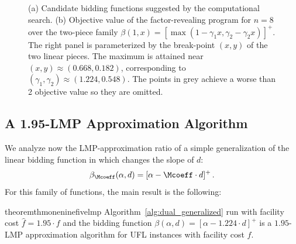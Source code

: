 \begin{figure}[H]
\centering
\begin{subfigure}{.465\textwidth}
  \centering
  \raisebox{0.0in}{}
  \caption{}
  \label{fig:sub1}
\end{subfigure}%
\begin{subfigure}{.535\textwidth}
  \centering
  \raisebox{0in}{}
  \caption{}
  \label{fig:sub2}
\end{subfigure}
\caption{(a) Candidate bidding functions suggested by the computational search. (b) Objective value of the factor-revealing program for $n=8$ over the two-piece family $\beta(1,x)=[\max(1 - \gamma_1 x, \gamma_2 - \gamma_2 x)]^+$. The right panel is parameterized by the break-point $(x, y)$ of the two linear pieces.
The maximum is attained near $(x,y)\approx(0.668,0.182)$, corresponding to $(\gamma_1,\gamma_2) \approx (1.224,0.548)$. The points in grey achieve a worse than 2 objective value so they are omitted.}

\label{fig:test}
\end{figure}

\subsection{A 1.95-LMP Approximation Algorithm}\label{sec:informal-proof-thm-195}

We analyze now the LMP-approximation ratio of a simple generalization of the linear bidding function in \cite{JMS02,JainMMSV03} which changes the slope of $d$:
\begin{equation*}    
    \beta_{\Mcoeff}(\alpha, d) = [\alpha - \Mcoeff \cdot d]^+\,.
\end{equation*}
For this family of functions, the main result is the following:
\begin{restatable}{theorem}{thmoneninefivelmp}\label{thm:1.95-lmp}
    Algorithm~\ref{alg:dual_generalized} run with facility cost $\hat{f} = 1.95 \cdot f$ and the bidding function $\beta(\alpha,d) = [\alpha - 1.224\cdot d]^{+}$ is a $1.95$-LMP approximation algorithm for UFL instances with facility cost $f$.
\end{restatable}

